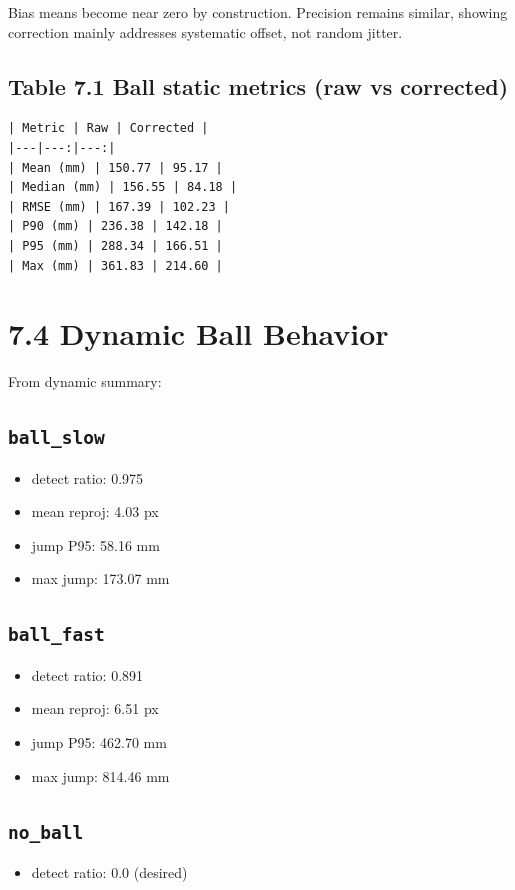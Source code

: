 Bias means become near zero by construction. Precision remains similar, showing correction mainly addresses systematic offset, not random jitter.

\subsection{Table 7.1 Ball static metrics (raw vs corrected)}
\begin{verbatim}
| Metric | Raw | Corrected |
|---|---:|---:|
| Mean (mm) | 150.77 | 95.17 |
| Median (mm) | 156.55 | 84.18 |
| RMSE (mm) | 167.39 | 102.23 |
| P90 (mm) | 236.38 | 142.18 |
| P95 (mm) | 288.34 | 166.51 |
| Max (mm) | 361.83 | 214.60 |
\end{verbatim}

\section{7.4 Dynamic Ball Behavior}
From dynamic summary:

\subsection{\texttt{ball\_slow}}
\begin{itemize}
  \item detect ratio: 0.975
  \item mean reproj: 4.03 px
  \item jump P95: 58.16 mm
  \item max jump: 173.07 mm
\end{itemize}

\subsection{\texttt{ball\_fast}}
\begin{itemize}
  \item detect ratio: 0.891
  \item mean reproj: 6.51 px
  \item jump P95: 462.70 mm
  \item max jump: 814.46 mm
\end{itemize}

\subsection{\texttt{no\_ball}}
\begin{itemize}
  \item detect ratio: 0.0 (desired)
\end{itemize}

